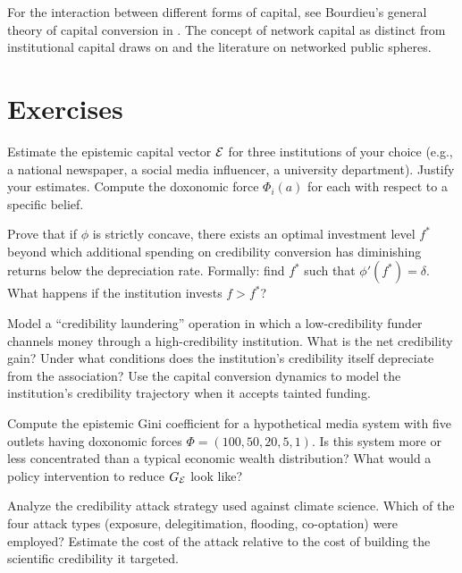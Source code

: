 For the interaction between different forms of capital, see Bourdieu's general theory of capital conversion in \textcite{bourdieu1984}.
The concept of network capital as distinct from institutional capital draws on \textcite{benkler2006} and the literature on networked public spheres.


\section{Exercises}

\begin{exercise}
Estimate the epistemic capital vector $\mathcal{E}$ for three institutions of your choice (e.g., a national newspaper, a social media influencer, a university department).
Justify your estimates.
Compute the doxonomic force $\Phi_i(a)$ for each with respect to a specific belief.
\end{exercise}

\begin{exercise}
Prove that if $\phi$ is strictly concave, there exists an optimal investment level $f^*$ beyond which additional spending on credibility conversion has diminishing returns below the depreciation rate.
Formally: find $f^*$ such that $\phi'(f^*) = \delta$.
What happens if the institution invests $f > f^*$?
\end{exercise}

\begin{exercise}
Model a ``credibility laundering'' operation in which a low-credibility funder channels money through a high-credibility institution.
What is the net credibility gain?
Under what conditions does the institution's credibility itself depreciate from the association?
Use the capital conversion dynamics to model the institution's credibility trajectory when it accepts tainted funding.
\end{exercise}

\begin{exercise}
\label{ex:ch6-gini}
Compute the epistemic Gini coefficient for a hypothetical media system with five outlets having doxonomic forces $\Phi = (100, 50, 20, 5, 1)$.
Is this system more or less concentrated than a typical economic wealth distribution?
What would a policy intervention to reduce $G_{\mathcal{E}}$ look like?
\end{exercise}

\begin{exercise}
Analyze the credibility attack strategy used against climate science.
Which of the four attack types (exposure, delegitimation, flooding, co-optation) were employed?
Estimate the cost of the attack relative to the cost of building the scientific credibility it targeted.
\end{exercise}

